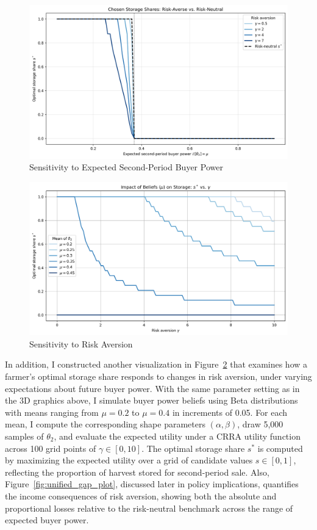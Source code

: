 \begin{figure}[ht!]
\centering
\includegraphics[width=\textwidth]{model_figures/sensitivity_to_theta_2.png}
\caption{Sensitivity to Expected Second-Period Buyer Power}
\label{Figure: sensitivity to second-period buyer power}
\end{figure}

\begin{figure}[ht!]
\centering
\includegraphics[width=\textwidth]{model_figures/sensitivity_to_gamma.png}
\caption{Sensitivity to Risk Aversion}
\label{Figure: sensitivity to risk aversion}
\end{figure}


In addition, I constructed another visualization in Figure~\ref{Figure: sensitivity to risk aversion} that examines how a farmer's optimal storage share responds to changes in risk aversion, under varying expectations about future buyer power. With the same parameter setting as in the 3D graphics above, I simulate buyer power beliefs using Beta distributions with means ranging from $\mu = 0.2$ to $\mu = 0.4$ in increments of 0.05. For each mean, I compute the corresponding shape parameters $(\alpha, \beta)$, draw 5,000 samples of $\theta_2$, and evaluate the expected utility under a CRRA utility function across 100 grid points of $\gamma \in [0, 10]$. The optimal storage share $s^*$ is computed by maximizing the expected utility over a grid of candidate values $s \in [0, 1]$, reflecting the proportion of harvest stored for second-period sale. Also, Figure~\ref{fig:unified_gap_plot}, discussed later in policy implications, quantifies the income consequences of risk aversion, showing both the absolute and proportional losses relative to the risk-neutral benchmark across the range of expected buyer power.




